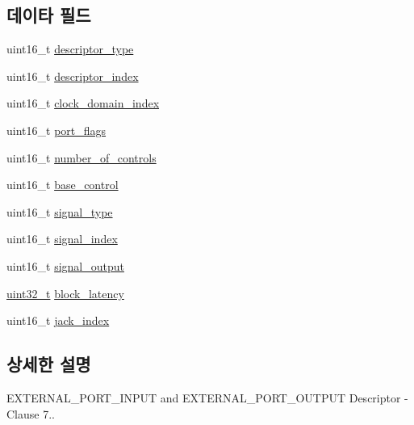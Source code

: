 \subsection*{데이타 필드}
\begin{DoxyCompactItemize}
\item 
uint16\+\_\+t \hyperlink{structjdksavdecc__descriptor__external__port_ab7c32b6c7131c13d4ea3b7ee2f09b78d}{descriptor\+\_\+type}
\item 
uint16\+\_\+t \hyperlink{structjdksavdecc__descriptor__external__port_a042bbc76d835b82d27c1932431ee38d4}{descriptor\+\_\+index}
\item 
uint16\+\_\+t \hyperlink{structjdksavdecc__descriptor__external__port_a6608f023d147b556a49527d568abed8e}{clock\+\_\+domain\+\_\+index}
\item 
uint16\+\_\+t \hyperlink{structjdksavdecc__descriptor__external__port_a60a1f1704542df3b3f6e6db56622ddd9}{port\+\_\+flags}
\item 
uint16\+\_\+t \hyperlink{structjdksavdecc__descriptor__external__port_a0104bea638bdadf1a547c2b93813e22f}{number\+\_\+of\+\_\+controls}
\item 
uint16\+\_\+t \hyperlink{structjdksavdecc__descriptor__external__port_af06eac7dd98377a85258308e8a25e7f2}{base\+\_\+control}
\item 
uint16\+\_\+t \hyperlink{structjdksavdecc__descriptor__external__port_a248e60ef99d5ed1779989d1dd6b6dc5a}{signal\+\_\+type}
\item 
uint16\+\_\+t \hyperlink{structjdksavdecc__descriptor__external__port_ae2e81a95ee9ad83f1fe22b6a1ee29075}{signal\+\_\+index}
\item 
uint16\+\_\+t \hyperlink{structjdksavdecc__descriptor__external__port_ab4b91864e6fc335d7e86536d9f4461e4}{signal\+\_\+output}
\item 
\hyperlink{parse_8c_a6eb1e68cc391dd753bc8ce896dbb8315}{uint32\+\_\+t} \hyperlink{structjdksavdecc__descriptor__external__port_ae2e9f0088d5e900b610d1b2818dfc559}{block\+\_\+latency}
\item 
uint16\+\_\+t \hyperlink{structjdksavdecc__descriptor__external__port_ab21cbae1a33ecc3062208bee181c262f}{jack\+\_\+index}
\end{DoxyCompactItemize}


\subsection{상세한 설명}
E\+X\+T\+E\+R\+N\+A\+L\+\_\+\+P\+O\+R\+T\+\_\+\+I\+N\+P\+UT and E\+X\+T\+E\+R\+N\+A\+L\+\_\+\+P\+O\+R\+T\+\_\+\+O\+U\+T\+P\+UT Descriptor -\/ Clause 7.. 

